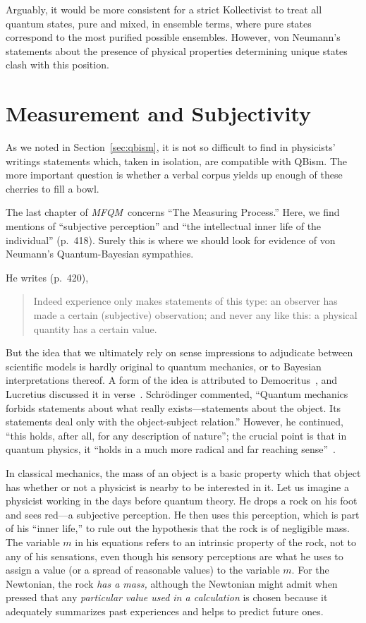 \documentclass[aps,pra,superscriptaddress,12pt,tightenlines,nofootinbib]{revtex4}
\newcommand{\MFQM}{\textsl{MFQM}}
\begin{document}
Arguably, it would be more consistent for a strict Kollectivist to
treat all quantum states, pure and mixed, in ensemble terms, where
pure states correspond to the most purified possible ensembles.
However, von Neumann's statements about the presence of physical
properties determining unique states clash with this position.


\section{Measurement and Subjectivity}

As we noted in Section~\ref{sec:qbism}, it is not so difficult to find
in physicists' writings statements which, taken in isolation, are
compatible with QBism.  The more important question is whether a
verbal corpus yields up enough of these cherries to fill a bowl.

The last chapter of \MFQM\ concerns ``The Measuring Process.''  Here,
we find mentions of ``subjective perception'' and ``the intellectual
inner life of the individual'' (p.\ 418).  Surely this is where we
should look for evidence of von Neumann's Quantum-Bayesian
sympathies.  

He writes (p.\ 420),
\begin{quotation}
\noindent Indeed experience only makes statements of this type: an
observer has made a certain (subjective) observation; and never any
like this: a physical quantity has a certain value.
\end{quotation}
But the idea that we ultimately rely on sense impressions to
adjudicate between scientific models is hardly original to quantum
mechanics, or to Bayesian interpretations thereof.  A form of the idea
is attributed to Democritus~\cite{DK68B9}, and Lucretius discussed it
in verse~\cite{Lucretius}.  Schr\"odinger commented, ``Quantum
mechanics forbids statements about what really exists---statements
about the object. Its statements deal only with the object-subject
relation.''  However, he continued, ``this holds, after all, for any
description of nature''; the crucial point is that in quantum physics,
it ``holds in a much more radical and far reaching sense''~\cite{AJP}.

In classical mechanics, the mass of an object is a basic property
which that object has whether or not a physicist is nearby to be
interested in it.  Let us imagine a physicist working in the days
before quantum theory.  He drops a rock on his foot and sees red---a
subjective perception.  He then uses this perception, which is part of
his ``inner life,'' to rule out the hypothesis that the rock is of
negligible mass.  The variable $m$ in his equations refers to an
intrinsic property of the rock, not to any of his sensations, even
though his sensory perceptions are what he uses to assign a value (or
a spread of reasonable values) to the variable $m$.  For the
Newtonian, the rock \emph{has a mass,} although the Newtonian might
admit when pressed that any \emph{particular value used in a
  calculation} is chosen because it adequately summarizes past
experiences and helps to predict future ones.
\end{document}
